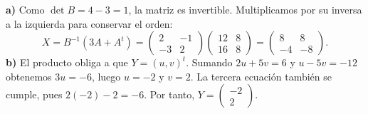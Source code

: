 \textbf{a)} Como $\det B=4-3=1$, la matriz es invertible. Multiplicamos por su inversa a la izquierda para conservar el orden:
\[
X=B^{-1}(3A+A^t)
=\begin{pmatrix}2&-1\\-3&2\end{pmatrix}
\begin{pmatrix}12&8\\16&8\end{pmatrix}
=\boxed{\begin{pmatrix}8&8\\-4&-8\end{pmatrix}}.
\]
\textbf{b)} El producto obliga a que $Y=(u,v)^t$. Sumando $2u+5v=6$ y $u-5v=-12$ obtenemos $3u=-6$, luego $u=-2$ y $v=2$. La tercera ecuación también se cumple, pues $2(-2)-2=-6$. Por tanto, $Y=\boxed{\begin{pmatrix}-2\\2\end{pmatrix}}$.
